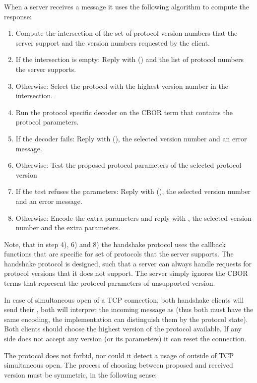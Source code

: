 When a server receives a \MsgProposeVersions{} message it uses the following algorithm to
compute the response:
\begin{enumerate}
\item
  Compute the intersection of the set of protocol version numbers that the server support
  and the version numbers requested by the client.
\item
  If the intersection is empty:
  Reply with \MsgRefuse(\VersionMismatch) and the list of protocol numbers the server supports.
\item
  Otherwise:
  Select the protocol with the highest version number in the intersection.
\item
  Run the protocol specific decoder on the CBOR term that contains the protocol parameters.
\item
  If the decoder fails:
  Reply with \MsgRefuse(\HandshakeDecodeError), the selected version number and an error message.
\item
  Otherwise: Test the proposed protocol parameters of the selected protocol version
\item
  If the test refuses the parameters:
    Reply with \MsgRefuse(\Refused), the selected version number and an error message.
\item
  Otherwise:
  Encode the extra parameters and
  reply with \MsgAcceptVersion, the selected version number and the extra parameters.
\end{enumerate}
Note, that in step 4), 6) and 8) the handshake protocol uses the callback functions that are specific
for set of protocols that the server supports.
The handshake protocol is designed,
such that a server can always handle requests for protocol versions that it does not support.
The server simply ignores the CBOR terms that represent the protocol parameters of unsupported
version.

In case of simultaneous open of a TCP connection, both handshake clients will
send their \MsgProposeVersions{}, both will interpret the incoming message as
\MsgReplyVersions{} (thus both must have the same encoding, the implementation
can distinguish them by the protocol state).  Both clients should choose the
highest version of the protocol available.  If any side does not accept any
version (or its parameters) it can reset the connection.

The protocol does not forbid, nor could it detect a usage of
\MsgReplyVersions{} outside of TCP simultaneous open.  The process of
choosing between proposed and received version must be symmetric, in the
following sense:


